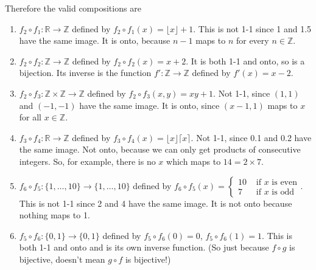 \documentclass[11pt,dvipsnames]{book}
\def\R{\mathbb{R}}
\def\Z{\mathbb{Z}}
\numberwithin{equation}{section} %
\numberwithin{figure}{section} %
\numberwithin{table}{section} %
\begin{document}
\begin{exercise}
\begin{solution}
Therefore the valid compositions are
\begin{enumerate}[label=(\alph*)]
 \item $f_2 \circ f_1 \colon \R \to \Z$ defined by $f_2 \circ f_1(x) = \lfloor x \rfloor + 1$. This is not 1-1 since 1 and 1.5 have the same image. It is onto, because $n-1$ maps to $n$ for every $n \in \Z$.
\item $f_2 \circ f_2 \colon \Z \to\Z$ defined by $f_2 \circ f_2(x) = x+2$. It is both 1-1 and onto, so is a bijection. Its inverse is the function $f'\colon \Z \to \Z$ defined by $f'(x) = x-2$.
 \item $f_2 \circ f_3 \colon \Z \times \Z \to \Z$ defined by $f_2 \circ f_3(x,y) = xy+1$. Not 1-1, since $(1,1)$ and $(-1,-1)$ have the same image. It is onto, since $(x-1,1)$ maps to $x$ for all $x \in \Z$.
 \item $f_3 \circ f_4 \colon \R \to \Z$ defined by $f_3 \circ f_4 (x) = \lfloor x \rfloor \lceil x \rceil$. Not 1-1, since 0.1 and 0.2 have the same image. Not onto, because we can only get products of consecutive integers. So, for example, there is no $x$ which maps to $14 = 2 \times 7$.
 \item $f_6 \circ f_5 \colon \{1,\dots, 10\} \to \{1,\dots, 10\}$ defined by $f_6 \circ f_5(x) = \begin{cases} 10 & \text{ if }x \text{ is even} \\7 & \text{ if }x \text{ is odd} \end{cases}$. This is not 1-1 since 2 and 4 have the same image. It is not onto because nothing maps to 1.
 \item $f_5 \circ f_6 \colon \{0,1\} \to \{0,1\}$ defined by $f_5 \circ f_6(0) = 0$, $f_5 \circ f_6(1) = 1$. This is both 1-1 and onto and is its own inverse function. (So just because $f \circ g$ is bijective, doesn't mean $g \circ f$ is bijective!)
\end{enumerate}

\end{solution}






\end{exercise}


%
%
\end{document}
